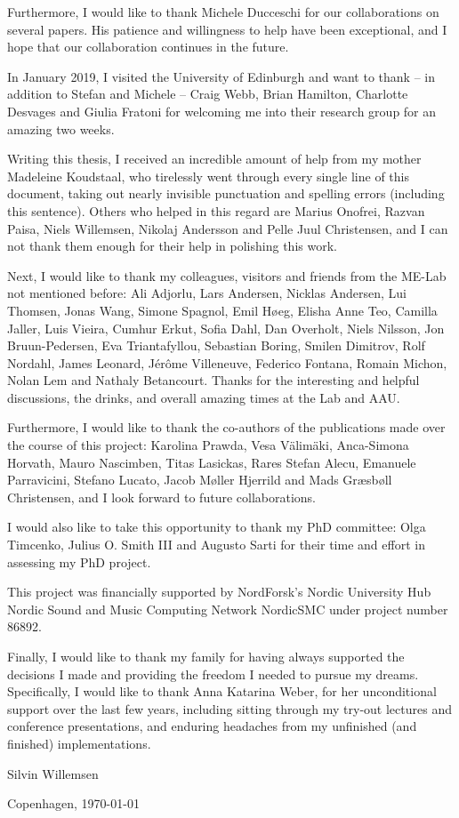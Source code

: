 Furthermore, I would like to thank Michele Ducceschi for our collaborations on several papers. His patience and willingness to help have been exceptional, and I hope that our collaboration continues in the future.

In January 2019, I visited the University of Edinburgh and want to thank -- in addition to Stefan and Michele -- Craig Webb, Brian Hamilton, Charlotte Desvages and Giulia Fratoni for welcoming me into their research group for an amazing two weeks. 

Writing this thesis, I received an incredible amount of help from my mother Madeleine Koudstaal, who tirelessly went through every single line of this document, taking out nearly invisible punctuation and spelling errors (including this sentence). Others who helped in this regard are Marius Onofrei, Razvan Paisa, Niels Willemsen, Nikolaj Andersson and Pelle Juul Christensen, and I can not thank them enough for their help in polishing this work.

Next, I would like to thank my colleagues, visitors and friends from the ME-Lab not mentioned before: Ali Adjorlu, Lars Andersen, Nicklas Andersen, Lui Thomsen, Jonas Wang, Simone Spagnol, Emil H{\o}eg, Elisha Anne Teo, Camilla Jaller, Luis Vieira, Cumhur Erkut, Sofia Dahl, Dan Overholt, Niels Nilsson, Jon Bruun-Pedersen, Eva Triantafyllou, Sebastian Boring, Smilen Dimitrov, Rolf Nordahl, James Leonard, J{\'e}r{\^o}me Villeneuve, Federico Fontana, Romain Michon, Nolan Lem and Nathaly Betancourt. Thanks for the interesting and helpful discussions, the drinks, and overall amazing times at the Lab and AAU.

Furthermore, I would like to thank the co-authors of the publications made over the course of this project: Karolina Prawda, Vesa V{\"a}lim{\"a}ki, Anca-Simona Horvath, Mauro Nascimben, Titas Lasickas, Rares Stefan Alecu, Emanuele Parravicini, Stefano Lucato, Jacob M{\o}ller Hjerrild and Mads Græsbøll Christensen, and I look forward to future collaborations. 

I would also like to take this opportunity to thank my PhD committee: Olga Timcenko, Julius O. Smith III and Augusto Sarti for their time and effort in assessing my PhD project.

This project was financially supported by NordForsk's Nordic University Hub Nordic Sound and Music Computing Network NordicSMC under project number 86892.

Finally, I would like to thank my family for having always supported the decisions I made and providing the freedom I needed to pursue my dreams. Specifically, I would like to thank Anna Katarina Weber, for her unconditional support over the last few years, including sitting through my try-out lectures and conference presentations, and enduring headaches from my unfinished (and finished) implementations.

\vfill
\hfill Silvin Willemsen

\hfill Copenhagen, \today
